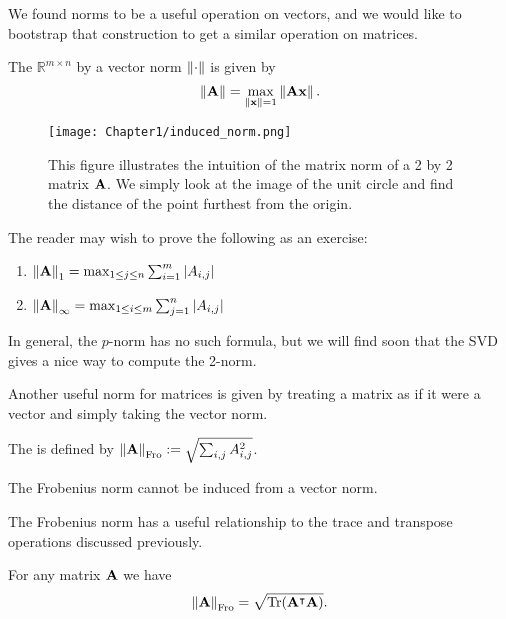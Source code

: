 We found norms to be a useful operation on vectors, and we would like to bootstrap that construction to get a similar operation on matrices.

\begin{definition}
The  $\mathbb R^{m \times n}$ by a vector norm $\norm{\cdot}$ is given by 
$$\norm{\MA} = \max_{\norm{\vx} = 1} \norm{\MA\vx}.$$
\end{definition}

\begin{figure}
\centering
  \texttt{[image: Chapter1/induced\_norm.png]}
  \caption{This figure illustrates the intuition of the matrix norm of a 2 by 2 matrix $\MA$. We simply look at the image of the unit circle and find the distance of the point furthest from the origin.}
\end{figure}

\begin{example}
    The reader may wish to prove the following as an exercise:
    \begin{enumerate}
        \item $\norm{\MA}_1 = \max_{1 \leq j \leq n} \sum_{i = 1}^m |A_{i,j}|$
        \item $\norm{\MA}_{\infty} = \max_{1 \leq i \leq m} \sum_{j = 1}^n |A_{i,j}|$
    \end{enumerate}
    In general, the $p$-norm has no such formula, but we will find soon that the SVD gives a nice way to compute the 2-norm.
\end{example}

Another useful norm for matrices is given by treating a matrix as if it were a vector and simply taking the vector norm.

\begin{definition}
The  is defined by
$\norm{\MA}_\Fro := \sqrt{\sum_{i,j} A_{i,j}^2}$.
\end{definition}

\begin{note}
The Frobenius norm cannot be induced from a vector norm.
\end{note}

The Frobenius norm has a useful relationship to the trace and transpose operations discussed previously.

\begin{proposition}
For any matrix $\MA$ we have
$$\norm{\MA}_\Fro  = \sqrt{\trace(\MA^\intercal\MA)}.$$
\end{proposition}

